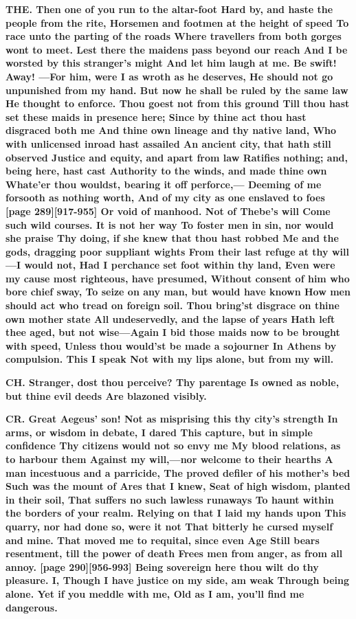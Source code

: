 \documentclass[11pt,letter]{book}
\begin{document}
\par \textbf{THE. Then one of you run to the altar-foot Hard by, and haste the people from the rite, Horsemen and footmen at the height of speed To race unto the parting of the roads Where travellers from both gorges wont to meet. Lest there the maidens pass beyond our reach And I be worsted by this stranger’s might And let him laugh at me. Be swift! Away! —For him, were I as wroth as he deserves, He should not go unpunished from my hand. But now he shall be ruled by the same law He thought to enforce. Thou goest not from this ground Till thou hast set these maids in presence here; Since by thine act thou hast disgraced both me And thine own lineage and thy native land, Who with unlicensed inroad hast assailed An ancient city, that hath still observed Justice and equity, and apart from law Ratifies nothing; and, being here, hast cast Authority to the winds, and made thine own Whate’er thou wouldst, bearing it off perforce,— Deeming of me forsooth as nothing worth, And of my city as one enslaved to foes [page 289][917-955] Or void of manhood. Not of Thebe’s will Come such wild courses. It is not her way To foster men in sin, nor would she praise Thy doing, if she knew that thou hast robbed Me and the gods, dragging poor suppliant wights From their last refuge at thy will—I would not, Had I perchance set foot within thy land, Even were my cause most righteous, have presumed, Without consent of him who bore chief sway, To seize on any man, but would have known How men should act who tread on foreign soil. Thou bring’st disgrace on thine own mother state All undeservedly, and the lapse of years Hath left thee aged, but not wise—Again I bid those maids now to be brought with speed, Unless thou would’st be made a sojourner In Athens by compulsion. This I speak Not with my lips alone, but from my will.}
\par 

\par \textbf{CH. Stranger, dost thou perceive? Thy parentage Is owned as noble, but thine evil deeds Are blazoned visibly.}
\par 

\par \textbf{CR. Great Aegeus’ son! Not as misprising this thy city’s strength In arms, or wisdom in debate, I dared This capture, but in simple confidence Thy citizens would not so envy me My blood relations, as to harbour them Against my will,—nor welcome to their hearths A man incestuous and a parricide, The proved defiler of his mother’s bed Such was the mount of Ares that I knew, Seat of high wisdom, planted in their soil, That suffers no such lawless runaways To haunt within the borders of your realm. Relying on that I laid my hands upon This quarry, nor had done so, were it not That bitterly he cursed myself and mine. That moved me to requital, since even Age Still bears resentment, till the power of death Frees men from anger, as from all annoy. [page 290][956-993] Being sovereign here thou wilt do thy pleasure. I, Though I have justice on my side, am weak Through being alone. Yet if you meddle with me, Old as I am, you’ll find me dangerous.}
\par 
\end{document}
